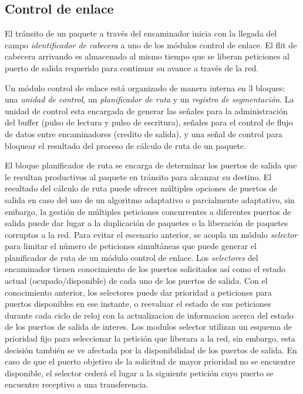 \subsection{Control de enlace}\label{subsec:control_de_enlace}

El tránsito de un paquete a través del encaminador inicia con la llegada del campo \textit{identificador de cabecera} a uno de los módulos control de enlace. El flit de cabecera arrivando es almacenado al mismo tiempo que se liberan peticiones al puerto de salida requerido para continuar su avance a través de la red.

Un módulo control de enlace está organizado de manera interna en 3 bloques: una \textit{unidad de control}, un \textit{planificador de ruta} y un \textit{registro de segmentación}. La unidad de control esta encargada de generar las señales para la administración del buffer (pulso de lectura y pulso de escritura), señales para el control de flujo de datos entre encaminadores (credito de salida), y una señal de control para bloquear el resultado del proceso de cálculo de ruta de un paquete.

El bloque planificador de ruta se encarga de determinar los puertos de salida que le resultan productivos al paquete en tránsito para alcanzar su destino. El resultado del cálculo de ruta puede ofrecer múltiples opciones de puertos de salida en caso del uso de un algoritmo adaptativo o parcialmente adaptativo, sin embargo, la gestión de múltiples peticiones concurrentes a diferentes puertos de salida puede dar lugar a la duplicación de paquetes o la liberación de paquetes corruptos a la red. Para evitar el escenario anterior, se acopla un módulo \textit{selector} para limitar el número de peticiones simultáneas que puede generar el planificador de ruta de un módulo control de enlace. Los \textit{selectores} del encaminador tienen conocimiento de los puertos solicitados así como el estado actual (ocupado/disponible) de cada uno de los puertos de salida. Con el conocimiento anterior, los selectores puede dar prioridad a peticiones para puertos disponibles en ese instante, o reevaluar el estado de sus peticiones durante cada ciclo de reloj con la actualizacion de informacion acerca del estado de los puertos de salida de interes. Los modulos selector utilizan un esquema de prioridad fijo para seleccionar la petición que liberara a la red, sin embargo, esta decisión también se ve afectada por la disponibilidad de los puertos de salida. En caso de que el puerto objetivo de la solicitud de mayor prioridad no se encuentre disponible, el selector cederá el lugar a la siguiente petición cuyo puerto se encuentre receptivo a una transferencia.

